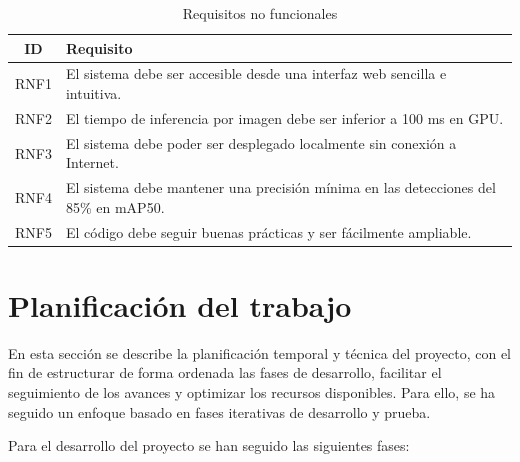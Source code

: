 \documentclass[12pt,a4paper,onecolumn,oneside]{report}
\begin{document}
\begin{table}[ht]
    \centering
    \caption{Requisitos no funcionales}
    \begin{tabularx}{1\textwidth}{| c | >{\centering\arraybackslash}X |}
        \hline
        \textbf{ID} & \textbf{Requisito}\\
        \hline
        RNF1 & El sistema debe ser accesible desde una interfaz web sencilla e intuitiva.\\
        \hline
        RNF2 & El tiempo de inferencia por imagen debe ser inferior a 100 ms en GPU.\\
        \hline
        RNF3 & El sistema debe poder ser desplegado localmente sin conexión a Internet.\\
        \hline
        RNF4 & El sistema debe mantener una precisión mínima en las detecciones del 85\% en mAP50.\\
        \hline
        RNF5 & El código debe seguir buenas prácticas y ser fácilmente ampliable.\\
        \hline
    \end{tabularx}
    \label{Req-No-Func}
\end{table}

\section{Planificación del trabajo}
\label{Plan de trabajo}

En esta sección se describe la planificación temporal y técnica del proyecto, con el fin de estructurar de forma ordenada las fases de desarrollo, facilitar el seguimiento de los avances y optimizar los recursos disponibles. Para ello, se ha seguido un enfoque basado en fases iterativas de desarrollo y prueba.

Para el desarrollo del proyecto se han seguido las siguientes fases:
\end{document}
